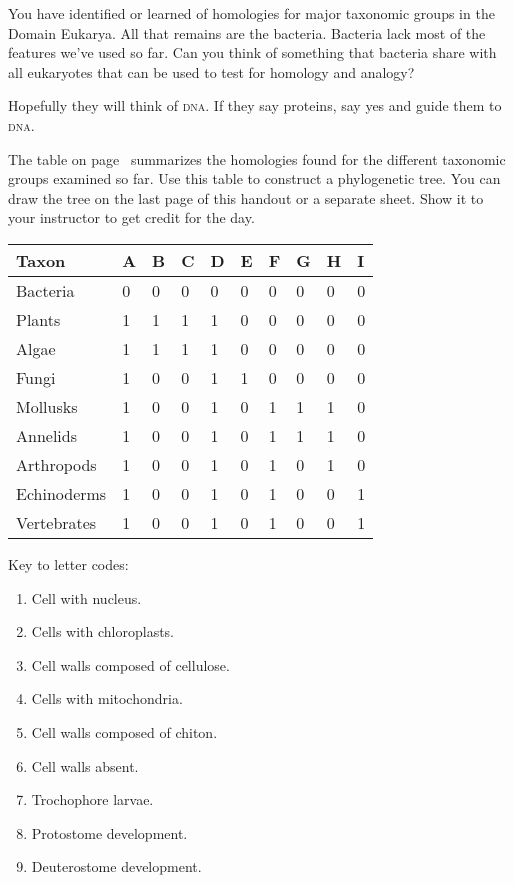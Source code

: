 \documentclass[12pt, hidelinks]{exam}
\newcommand*\AnswerBox[2]{%
    \parbox[t][#1]{0.92\textwidth}{%
    \begin{solution}#2\end{solution}}
    \vspace{\stretch{1}}
}
\begin{document}
\begin{questions}
\question
You have identified or learned of homologies for major taxonomic groups in the Domain Eukarya. All that remains are the bacteria. Bacteria lack most of the features we've used so far. Can you think of something that bacteria share with all eukaryotes that can be used to test for homology and analogy?

\AnswerBox{2\baselineskip}{Hopefully they will think of \textsc{dna}. If they say proteins, say yes and guide them to \textsc{dna.}}

\question[Checkout]
The table on page~\pageref{presence_table} summarizes the homologies found for the different taxonomic groups examined so far. Use this table to construct a phylogenetic tree. You can draw the tree on the last page of this handout or a separate sheet. Show it to your instructor to get credit for the day.


\end{questions}

\newpage

\begin{longtable}{@{}L{1in}L{0.25in}L{0.25in}L{0.25in}L{0.25in}L{0.25in}L{0.25in}L{0.25in}L{0.25in}L{0.25in}@{}}
\toprule
Taxon			&	A	&	B	&	C	&	D	&	E	&	F	&	G	&	H	&	I	\tabularnewline
\midrule
Bacteria		&	0	&	0	&	0	&	0	&	0	&	0	&	0	&	0	&	0	\tabularnewline
Plants			&	1	&	1	&	1	&	1	&	0	&	0	&	0	&	0	&	0	\tabularnewline
Algae			&	1	&	1	&	1	&	1	&	0	&	0	&	0	&	0	&	0	\tabularnewline
Fungi			&	1	&	0	&	0	&	1	&	1	&	0	&	0	&	0	&	0	\tabularnewline
Mollusks		&	1	&	0	&	0	&	1	&	0	&	1	&	1	&	1	&	0	\tabularnewline
Annelids		&	1	&	0	&	0	&	1	&	0	&	1	&	1	&	1	&	0	\tabularnewline
Arthropods	&	1	&	0	&	0	&	1	&	0	&	1	&	0	&	1	&	0	\tabularnewline
Echinoderms	&	1	&	0	&	0	&	1	&	0	&	1	&	0	&	0	&	1	\tabularnewline
Vertebrates	&	1	&	0	&	0	&	1	&	0	&	1	&	0	&	0	&	1	\tabularnewline
\bottomrule
\end{longtable}\label{presence_table}

Key to letter codes:

\begin{multicols}{2}
	\raggedcolumns
	\begin{enumerate}
		\item Cell with nucleus.
		\item Cells with chloroplasts.
		\item Cell walls composed of cellulose.
		\item Cells with mitochondria.
		\item Cell walls composed of chiton.
		\item Cell walls absent.
		\item Trochophore larvae.
		\item Protostome development.
		\item Deuterostome development.
	\end{enumerate}
\end{multicols}
\end{document}
